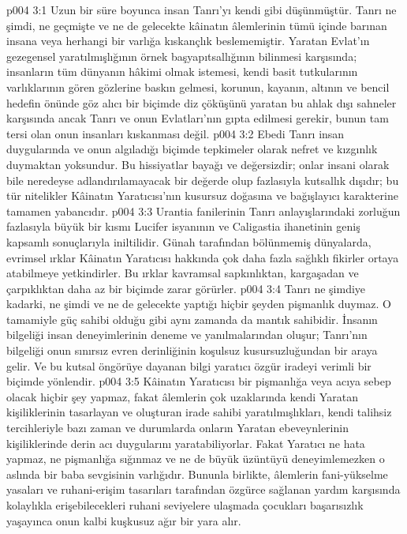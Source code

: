 \vs p004 3:1 Uzun bir süre boyunca insan Tanrı’yı kendi gibi düşünmüştür. Tanrı ne şimdi, ne geçmişte ve ne de gelecekte kâinatın âlemlerinin tümü içinde barınan insana veya herhangi bir varlığa kıskançlık beslememiştir. Yaratan Evlat’ın gezegensel yaratılmışlığının örnek başyapıtsallığının bilinmesi karşısında; insanların tüm dünyanın hâkimi olmak istemesi, kendi basit tutkularının varlıklarının gören gözlerine baskın gelmesi, korunun, kayanın, altının ve bencil hedefin önünde göz alıcı bir biçimde diz çöküşünü yaratan bu ahlak dışı sahneler karşısında ancak Tanrı ve onun Evlatları’nın  gıpta edilmesi gerekir, bunun tam tersi olan onun insanları kıskanması değil.
\vs p004 3:2 Ebedi Tanrı insan duygularında ve onun algıladığı biçimde tepkimeler olarak nefret ve kızgınlık duymaktan yoksundur. Bu hissiyatlar bayağı ve değersizdir; onlar insani olarak bile neredeyse adlandırılamayacak bir değerde olup fazlasıyla kutsallık dışıdır; bu tür nitelikler Kâinatın Yaratıcısı’nın kusursuz doğasına ve bağışlayıcı karakterine tamamen yabancıdır.
\vs p004 3:3 Urantia fanilerinin Tanrı anlayışlarındaki zorluğun fazlasıyla büyük bir kısmı Lucifer isyanının ve Caligastia ihanetinin geniş kapsamlı sonuçlarıyla iniltilidir. Günah tarafından bölünmemiş dünyalarda, evrimsel ırklar Kâinatın Yaratıcısı hakkında çok daha fazla sağlıklı fikirler ortaya atabilmeye yetkindirler. Bu ırklar kavramsal sapkınlıktan, kargaşadan ve çarpıklıktan daha az bir biçimde zarar görürler.
\vs p004 3:4 Tanrı ne şimdiye kadarki, ne şimdi ve ne de gelecekte yaptığı hiçbir şeyden pişmanlık duymaz. O tamamiyle güç sahibi olduğu gibi aynı zamanda da mantık sahibidir. İnsanın bilgeliği insan deneyimlerinin deneme ve yanılmalarından oluşur; Tanrı’nın bilgeliği onun sınırsız evren derinliğinin koşulsuz kusursuzluğundan bir araya gelir. Ve bu kutsal öngörüye dayanan bilgi yaratıcı özgür iradeyi verimli bir biçimde yönlendir.
\vs p004 3:5 Kâinatın Yaratıcısı bir pişmanlığa veya acıya sebep olacak hiçbir şey yapmaz, fakat âlemlerin çok uzaklarında kendi Yaratan kişiliklerinin tasarlayan ve oluşturan irade sahibi yaratılmışlıkları, kendi talihsiz tercihleriyle bazı zaman ve durumlarda onların Yaratan ebeveynlerinin kişiliklerinde derin acı duygularını yaratabiliyorlar. Fakat Yaratıcı ne hata yapmaz, ne pişmanlığa sığınmaz ve ne de büyük üzüntüyü deneyimlemezken o aslında bir baba sevgisinin varlığıdır. Bununla birlikte, âlemlerin fani\hyp{}yükselme yasaları ve ruhani\hyp{}erişim tasarıları tarafından özgürce sağlanan yardım karşısında kolaylıkla erişebilecekleri ruhani seviyelere ulaşmada çocukları başarısızlık yaşayınca onun kalbi kuşkusuz ağır bir yara alır.
